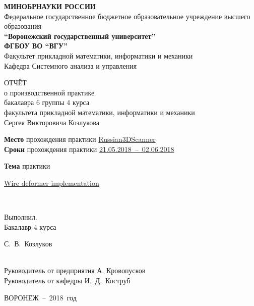 \documentclass[a4paper]{article}
\providecommand{\StudentName}{С.~В.~Козлуков}
\providecommand{\StudentNameGenitiv}{Сергея Викторовича Козлукова}
\providecommand{\StudentYear}{4}
\providecommand{\StudentGroup}{6}
\providecommand{\StudentDepartment}{Системного анализа и управления}
\providecommand{\UniversityAdvisor}{И.~Д.~Коструб}
\providecommand{\ExternshipPlace}{Russian3DScanner}
\providecommand{\ExternshipDates}{21.05.2018~--~02.06.2018}
\providecommand{\ExternshipSubject}{Wire deformer implementation}
\providecommand{\ExternshipPlaceAdvisor}{А. Кровопусков}
\begin{document}
\begin{center}
  \textbf{МИНОБРНАУКИ РОССИИ}\\
  Федеральное государственное бюджетное образовательное
  учреждение высшего образования\\
  \textbf{``Воронежский государственный университет''\\
    ФГБОУ ВО ``ВГУ''}\\[1cm]
  Факультет прикладной математики, информатики и механики\\
  Кафедра {\StudentDepartment}

  \vfill

  ОТЧЁТ\\
  о производственной практике\\
  бакалавра {\StudentGroup} группы {\StudentYear} курса\\
  факультета прикладной математики, информатики и механики\\
  {\StudentNameGenitiv}

  \vfill

  {
    \textbf{Место} прохождения практики \hfill \uline{\ExternshipPlace}
  }\\
  {
    \textbf{Сроки} прохождения практики \hfill \uline{\ExternshipDates}
  }\\
  {
    \textbf{Тема} практики \hfill
    \parbox{.33\textwidth}{
      \uline{\ExternshipSubject}
    }
  }\\

  \vfill

  {
    \parbox{.33\textwidth}{
      Выполнил. \\
      Бакалавр {\StudentYear} курса
    }
    \hfill\hrulefill\hspace{1cm}
    {\StudentName}
  }\\[1cm]

  {
    Руководитель от предприятия\hfill \hrulefill \hspace{1cm} {\ExternshipPlaceAdvisor}
  }\\[1cm]

  {
    Руководитель от кафедры\hfill \hrulefill \hspace{1cm} {\UniversityAdvisor}
  }

  \vfill

  ВОРОНЕЖ~--~2018~год
  
\end{center}
\end{document}
